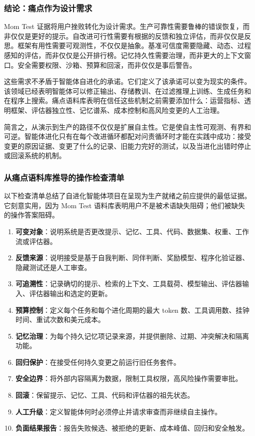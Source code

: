 \subsubsection{结论：痛点作为设计需求}
\label{sec:ch7-conclusion-english}

Mom Test 证据将用户挫败转化为设计需求。生产可靠性需要鲁棒的错误恢复，而非仅仅是更好的提示。自改进可行性需要有根据的反馈和独立评估，而非仅仅是反思。框架有用性需要可观测性，不仅仅是抽象。基准可信度需要隐藏、动态、过程感知的评估，而非仅仅是公开排行榜。记忆持久性需要治理，而非更大的上下文窗口。安全需要权限、沙箱、预算和回滚，而非仅仅是事后警告。

这些需求不矛盾于智能体自进化的承诺。它们定义了该承诺可以变为现实的条件。该领域已经表明智能体可以修正输出、存储教训、在过滤推理上训练、生成任务和在程序上搜索。痛点语料库表明在信任这些机制之前需要添加什么：运营指标、透明框架、评估器独立性、记忆谱系、成本控制和高风险变更的人工治理。

简言之，从演示到生产的路径不仅仅是扩展自主性。它是使自主性可观测、有界和可逆。智能体进化只有在每个改进循环都配对问责循环时才能在实践中成功：接受变更的原因证据、变更了什么的记录、旧能力完好的测试，以及当进化出错时停止或回滚系统的机制。

\subsubsection{从痛点语料库推导的操作检查清单}
\label{sec:ch7-operational-checklist-english}

以下检查清单总结了自进化智能体项目在呈现为生产就绪之前应提供的最低证据。它刻意实用，因为 Mom Test 语料库表明用户不是被术语缺失阻碍；他们被缺失的操作答案阻碍。

\begin{enumerate}[nosep]
\item \textbf{可变对象}：说明系统是否更改提示、记忆、工具、代码、数据集、权重、工作流或评估器。
\item \textbf{反馈来源}：说明接受是基于自我判断、同伴判断、奖励模型、程序化验证器、隐藏测试还是人工审查。
\item \textbf{可追溯性}：记录确切的提示、检索的上下文、工具载荷、模型输出、评估器输入、评估器输出和选定的更新。
\item \textbf{预算控制}：定义每个任务和每个进化周期的最大 token 数、工具调用数、挂钟时间、重试次数和美元成本。
\item \textbf{记忆治理}：为每个持久记忆项记录来源，并提供删除、过期、冲突解决和隔离功能。
\item \textbf{回归保护}：在接受任何持久变更之前运行旧任务套件。
\item \textbf{安全边界}：将外部内容隔离为数据，限制工具权限，高风险操作需要审批。
\item \textbf{回滚}：保留提示、记忆、工具、代码和评估器的祖先状态。
\item \textbf{人工升级}：定义智能体何时必须停止并请求审查而非继续自主操作。
\item \textbf{负面结果报告}：报告失败候选、被拒绝的更新、成本峰值、回归和安全触发。
\end{enumerate}

